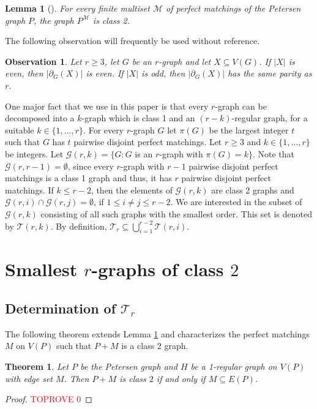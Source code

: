 \documentclass[a4paper,11pt]{article}
\newcommand{\ca}{\mathcal}
\newtheorem{theo}[defi]{Theorem}
\newtheorem{lem}[defi]{Lemma}
\newtheorem{obs}[defi]{Observation}
\theoremstyle{remark}
\begin{document}
\begin{lem} [\cite{Grunewald_Steffen_1999}] \label{lem: P^M class 2}
For every finite multiset $\ca M$ of perfect matchings of the Petersen graph $P$,
the graph $P^{\ca M}$ is class 2.
\end{lem}

The following observation  will  frequently   be used without reference.

\begin{obs}\label{Observation-same-parity}
Let $r\geq 3$, let $G$ be an $r$-graph and let $X \subseteq V(G)$. If $\vert X \vert$ is even, then $\vert \partial_G(X) \vert$ is even. If $\vert X \vert$ is odd, then $\vert \partial_G(X) \vert$ has the same parity as $r$.
\end{obs}

One major fact that we use in this paper is that every $r$-graph can be
decomposed into a $k$-graph which is class 1 and an $(r-k)$-regular graph, for a suitable $k \in \{1, \dots ,r\}$. 
For every $r$-graph $G$ let $\pi(G)$ be the largest integer $t$ such that $G$ has $t$ pairwise disjoint perfect matchings.
Let $r\ge3$ and $k\in \{1,\dots, r\}$ be integers. Let 
$\ca G(r,k)=\{G\colon G$ is an $r$-graph with $\pi(G)=k \}$. 
Note that $\ca G(r,r-1) = \emptyset$, since
every $r$-graph with $r-1$ pairwise disjoint perfect matchings is a class 1 graph
and thus, it has $r$ pairwise disjoint perfect matchings. If $ k \leq r-2$, then the elements
of $\ca G(r,k)$ are class 2 graphs and $\ca G(r,i) \cap \ca G(r,j) = \emptyset$, if $1 \leq i \not = j \leq r-2$. We are interested in 
 the subset of $\ca G(r,k)$ consisting of all such graphs with the smallest order.
 This set is denoted by $\ca T(r,k)$.
 By definition, $\ca T_r \subseteq \bigcup_{i=1}^{r-2} \ca T(r,i)$.

\section{Smallest $r$-graphs of class $2$} \label{Sec: smallest r-graphs}

\subsection{Determination of $\ca T_r$} 




The following theorem extends Lemma \ref{lem: P^M class 2} and characterizes the perfect matchings $M$ on $V(P)$ such that $P+M$ is a class $2$ graph.

\begin{theo}\label{theo:P+matching}
	Let $P$ be the Petersen graph and $H$ be a 1-regular graph on 
	$V(P)$ with edge set $M$. Then $P+M$ is class $2$ if and only if $M\subseteq E(P)$.
\end{theo}
\begin{proof}\textcolor{red}{TOPROVE 0}\end{proof}
\end{document}
